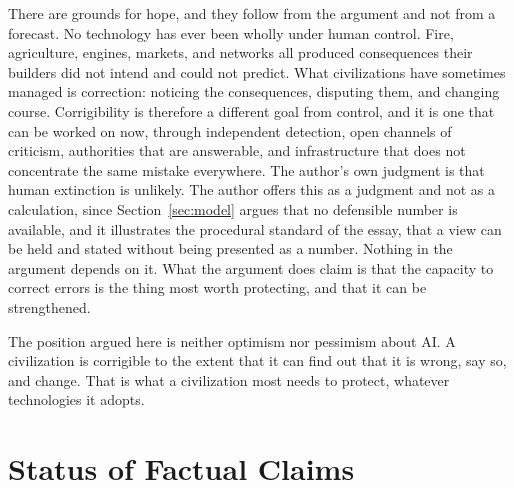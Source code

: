 \documentclass[11pt]{article}
\begin{document}
There are grounds for hope, and they follow from the argument and not from a forecast. No technology has ever been wholly under human control. Fire, agriculture, engines, markets, and networks all produced consequences their builders did not intend and could not predict. What civilizations have sometimes managed is correction: noticing the consequences, disputing them, and changing course. Corrigibility is therefore a different goal from control, and it is one that can be worked on now, through independent detection, open channels of criticism, authorities that are answerable, and infrastructure that does not concentrate the same mistake everywhere. The author's own judgment is that human extinction is unlikely. The author offers this as a judgment and not as a calculation, since Section~\ref{sec:model} argues that no defensible number is available, and it illustrates the procedural standard of the essay, that a view can be held and stated without being presented as a number. Nothing in the argument depends on it. What the argument does claim is that the capacity to correct errors is the thing most worth protecting, and that it can be strengthened.

The position argued here is neither optimism nor pessimism about AI. A civilization is corrigible to the extent that it can find out that it is wrong, say so, and change. That is what a civilization most needs to protect, whatever technologies it adopts.

\appendix
\section{Status of Factual Claims}
\end{document}
